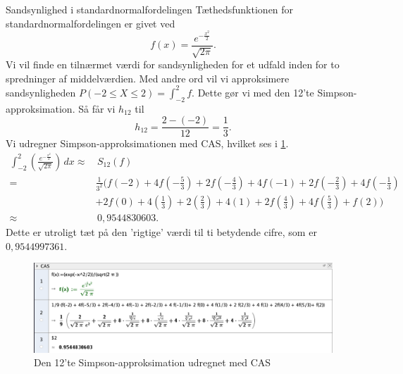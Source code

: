 \begin{example}[label=exa:standardnormalfordeling]{Sandsynlighed i standardnormalfordelingen }{}
  Tæthedsfunktionen for standardnormalfordelingen er givet ved
  \[
  f(x)=\frac{e^{-\frac{x^2}{2}} }{\sqrt{2 \pi } }.
  \] 
Vi vil finde en tilnærmet værdi for sandsynligheden for et udfald inden for to spredninger af middelværdien.
  Med andre ord vil vi approksimere sandsynligheden $P(-2 \leq X \leq 2) = \int_{-2}^{2} f$.
  Dette gør vi med den 12'te Simpson-approksimation.
  Så får vi $h_{12}$ til
  \[
  h_{12}=\frac{2-(-2)}{12}=\frac{1}{3}.
  \] 
  Vi udregner Simpson-approksimationen med CAS, hvilket ses i \cref{fig:CAS}.
  \begin{equation*}
  \begin{split}
    \int_{-2}^{2} \left(\frac{e^{-\frac{x^2}{2}} }{\sqrt{2 \pi } }\right)\,dx  \approx& \,S _{12}(f)\\
    =&\frac{1}{3^2} \Biggl(f(-2) + 4f\left(-\frac{5}{3}\right) + 2f\left(-\frac{4}{3}\right) + 4f(-1) + 2f\left(-\frac{2}{3}\right) + 4 f\left(-\frac{1}{3}\right) \\ 
    &+ 2 f(0) + 4 \left(\frac{1}{3}\right) + 2 \left(\frac{2}{3}\right) + 4 \left(1\right)  + 2f\left(\frac{4}{3}\right) + 4f\left(\frac{5}{3}\right)+ f(2)\Biggl)\\
    \approx& \,0,9544830603.
  \end{split}
  \end{equation*}
  Dette er utroligt tæt på den 'rigtige' værdi til ti betydende cifre, som er $0,9544997361$.
  \begin{figure}[H]
  \begin{center}
    \includegraphics[width=\textwidth]{fig/CAS10deci.png}
  \end{center}
  \caption{Den 12'te Simpson-approksimation udregnet med CAS}
  \label{fig:CAS}
  \end{figure}
\end{example}
 


